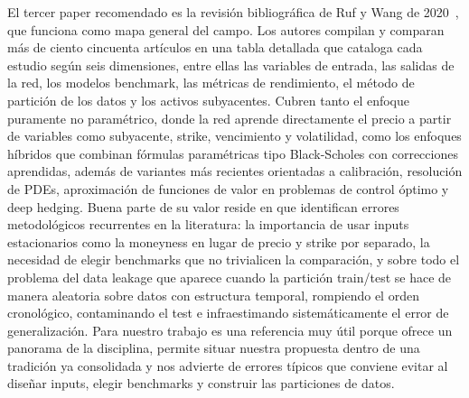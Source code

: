 \documentclass[11pt,a4paper]{article}
\begin{document}
El tercer paper recomendado es la revisión bibliográfica de Ruf y Wang de 2020~\cite{ruf2020}, que funciona como mapa general del campo. Los autores compilan y comparan más de ciento cincuenta artículos en una tabla detallada que cataloga cada estudio según seis dimensiones, entre ellas las variables de entrada, las salidas de la red, los modelos benchmark, las métricas de rendimiento, el método de partición de los datos y los activos subyacentes. Cubren tanto el enfoque puramente no paramétrico, donde la red aprende directamente el precio a partir de variables como subyacente, strike, vencimiento y volatilidad, como los enfoques híbridos que combinan fórmulas paramétricas tipo Black-Scholes con correcciones aprendidas, además de variantes más recientes orientadas a calibración, resolución de PDEs, aproximación de funciones de valor en problemas de control óptimo y deep hedging. Buena parte de su valor reside en que identifican errores metodológicos recurrentes en la literatura: la importancia de usar inputs estacionarios como la moneyness en lugar de precio y strike por separado, la necesidad de elegir benchmarks que no trivialicen la comparación, y sobre todo el problema del data leakage que aparece cuando la partición train/test se hace de manera aleatoria sobre datos con estructura temporal, rompiendo el orden cronológico, contaminando el test e infraestimando sistemáticamente el error de generalización. Para nuestro trabajo es una referencia muy útil porque ofrece un panorama de la disciplina, permite situar nuestra propuesta dentro de una tradición ya consolidada y nos advierte de errores típicos que conviene evitar al diseñar inputs, elegir benchmarks y construir las particiones de datos.
\end{document}
